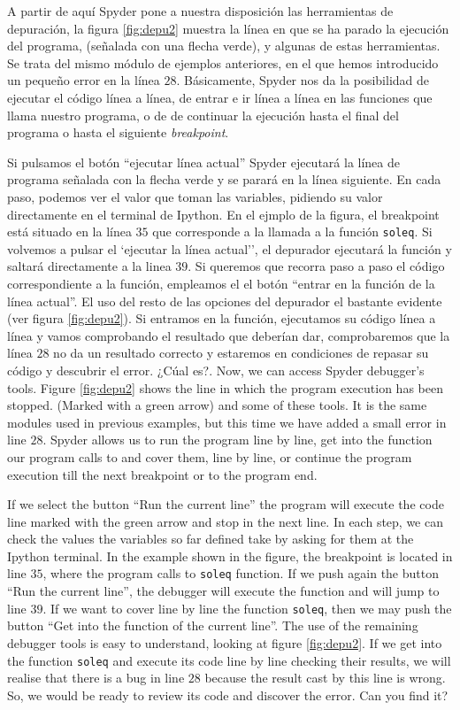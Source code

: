 \begin{paracol}{2}
A partir de aquí Spyder pone a nuestra disposición las herramientas de depuración, la figura \ref{fig:depu2} muestra la línea en que se ha parado la ejecución del programa, (señalada con una flecha verde), y algunas de estas herramientas. Se trata del mismo módulo de ejemplos anteriores, en el que hemos introducido un pequeño error en la línea $28$.  Básicamente, Spyder nos da la posibilidad de ejecutar el código línea a línea, de entrar e ir línea a línea en las funciones que llama nuestro programa, o de de continuar la ejecución hasta el final del programa o hasta el siguiente \emph{breakpoint}.

Si pulsamos el botón ``ejecutar línea actual'' Spyder ejecutará la línea de programa señalada con la flecha verde y se parará en la línea siguiente. En cada paso, podemos ver el valor que toman las variables, pidiendo su valor directamente en el terminal de Ipython. En el ejmplo de la figura, el breakpoint está situado en la línea $35$ que corresponde a la llamada a la función \texttt{soleq}. Si volvemos a pulsar el `ejecutar la línea actual'', el depurador ejecutará la función y saltará directamente a la linea $39$. Si queremos que recorra paso a paso el código correspondiente a la función, empleamos el el botón ``entrar en la función de la línea actual''. El uso del resto de las opciones del depurador el bastante evidente (ver figura \ref{fig:depu2}). Si entramos en la función, ejecutamos su código línea a línea y vamos comprobando el resultado que deberían dar, comprobaremos que la línea $28$ no da un resultado correcto y estaremos en condiciones de repasar su código y descubrir el error. ¿Cúal es?.
\switchcolumn
Now, we can access Spyder debugger's tools. Figure \ref{fig:depu2} shows the line in which the program execution has been stopped. (Marked with a green arrow) and some of these tools. It is the same modules used in previous examples, but this time we have added a small error in line $28$. Spyder allows us to run the program line by line, get into the function our program calls to and cover them, line by line, or continue the program execution till the next breakpoint or to the program end. 

If we select the button ``Run the current line'' the program will execute the code line marked with the green arrow and stop in the next line. In each step, we can check the values the variables so far defined take by asking for them at the Ipython terminal. In the example shown in the figure, the breakpoint is located in line $35$, where the program calls to \texttt{soleq} function. If we push again the button ``Run the current line'', the debugger will execute the function and will jump to line $39$. If we want to cover line by line the function \texttt{soleq}, then we may push the button ``Get into the function of the current line''. The use of the remaining debugger tools is easy to understand, looking at figure \ref{fig:depu2}. If we get into the function \texttt{soleq} and execute its code line by line checking their results, we will realise that there is a bug in line $28$ because the result cast by this line is wrong. So, we would be ready to review its code and discover the error. Can you find it?   
\switchcolumn

\end{paracol}
